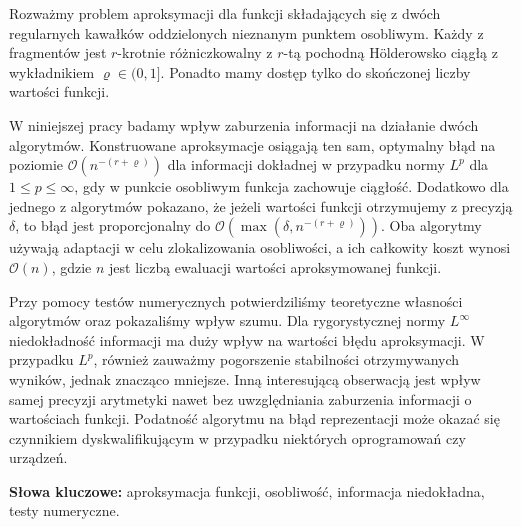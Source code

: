 \documentclass[oik, pdftex, man]{mgrwms}
\begin{document}
\begin{streszczenie}
    Rozważmy problem aproksymacji dla funkcji składających się z dwóch regularnych kawałków oddzielonych nieznanym punktem osobliwym. Każdy z fragmentów jest $r$-krotnie różniczkowalny z $r$-tą pochodną Hölderowsko ciągłą z wykładnikiem $\varrho \in (0,1]$. Ponadto mamy dostęp tylko do skończonej liczby wartości funkcji. 
    
    W niniejszej pracy badamy wpływ zaburzenia informacji na działanie dwóch algorytmów. Konstruowane aproksymacje osiągają ten sam, optymalny błąd na poziomie $\mathcal{O}(n^{-(r+\varrho)})$ dla informacji dokładnej w przypadku normy $L^{p}$ dla $1 \leq p \leq \infty$, gdy w punkcie osobliwym funkcja zachowuje ciągłość. Dodatkowo dla jednego z algorytmów pokazano, że jeżeli wartości funkcji otrzymujemy z precyzją $\delta$, to błąd jest proporcjonalny do $\mathcal{O}(\max(\delta, n^{-(r+\varrho)}))$. Oba algorytmy używają adaptacji w celu zlokalizowania osobliwości, a ich całkowity koszt wynosi $\mathcal{O}(n)$, gdzie $n$ jest liczbą ewaluacji wartości aproksymowanej funkcji.

    Przy pomocy testów numerycznych potwierdziliśmy teoretyczne własności algorytmów oraz pokazaliśmy wpływ szumu. Dla rygorystycznej normy $L^{\infty}$ niedokładność informacji ma duży wpływ na wartości błędu aproksymacji. W przypadku $L^{p}$, również zauważmy pogorszenie stabilności otrzymywanych wyników, jednak znacząco mniejsze. Inną interesującą obserwacją jest wpływ samej precyzji arytmetyki nawet bez uwzględniania zaburzenia informacji o wartościach funkcji. Podatność algorytmu na błąd reprezentacji może okazać się czynnikiem dyskwalifikującym w przypadku niektórych oprogramowań czy urządzeń.

    \vspace{10pt}
    \textbf{Słowa kluczowe:} aproksymacja funkcji, osobliwość, informacja niedokładna, testy numeryczne.
\end{streszczenie}

\end{document}

